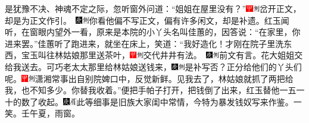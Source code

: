 是犹豫不决、神魂不定之际，忽听窗外问道：``姐姐在屋里没有？''{\includegraphics[width=3mm]{../Images/00002}\includegraphics[width=3mm]{../Images/00011}\footnotesize \kaishu 岔开正文，却是为正文作引。　\includegraphics[width=3mm]{../Images/00004}\includegraphics[width=3mm]{../Images/00011}\footnotesize \kaishu 你看他偏不写正文，偏有许多闲文，却是补遗。}红玉闻听，在窗眼内望外一看，原来是本院的小丫头名叫佳蕙的，因答说：``在家里，你进来罢。''佳蕙听了跑进来，就坐在床上，笑道：``我好造化！才刚在院子里洗东西，宝玉叫往林姑娘那里送茶叶，{\includegraphics[width=3mm]{../Images/00002}\includegraphics[width=3mm]{../Images/00011}\footnotesize \kaishu 交代井井有法。　\includegraphics[width=3mm]{../Images/00004}\includegraphics[width=3mm]{../Images/00011}\footnotesize \kaishu 前文有言。}花大姐姐交给我送去。可巧老太太那里给林姑娘送钱来，{\includegraphics[width=3mm]{../Images/00004}\includegraphics[width=3mm]{../Images/00011}\footnotesize \kaishu 是补写否？}正分给他们的丫头们呢。{\includegraphics[width=3mm]{../Images/00002}\includegraphics[width=3mm]{../Images/00011}\footnotesize \kaishu 潇湘常事出自别院婢口中，反觉新鲜。}见我去了，林姑娘就抓了两把给我，也不知多少。你替我收着。''便把手帕子打开，把钱倒了出来，红玉替他一五一十的数了收起。{\includegraphics[width=3mm]{../Images/00004}\includegraphics[width=3mm]{../Images/00010}\footnotesize \kaishu 此等细事是旧族大家闺中常情，今特为暴发钱奴写来作鉴。一笑。壬午夏，雨窗。}

